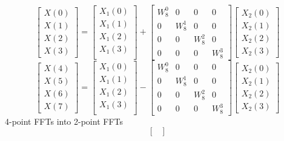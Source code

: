 \documentclass[journal,12pt,twocolumn]{IEEEtran}
\renewcommand\thesection{\arabic{section}}
\begin{document}
\begin{enumerate}[label=\arabic*.,ref=\thesection.\theenumi]
\begin{equation}
\begin{bmatrix}
X(0) \\ 
X(1) \\ 
X(2) \\ 
X(3)
\end{bmatrix}
=
\begin{bmatrix}
X_{1}(0) \\ 
X_{1}(1)\\ 
X_{1}(2)\\
X_{1}(3)\\
\end{bmatrix}
+
\begin{bmatrix}
W^{0}_{8} & 0 & 0 & 0\\
0 & W^{1}_{8} & 0 & 0\\
0 & 0 & W^{2}_{8} & 0\\
0 & 0 & 0 & W^{3}_{8}
\end{bmatrix}
\begin{bmatrix}
X_{2}(0) \\ 
X_{2}(1) \\ 
X_{2}(2) \\
X_{2}(3)
\end{bmatrix}
\end{equation}
\begin{equation}
\begin{bmatrix}
X(4) \\ 
X(5) \\ 
X(6) \\ 
X(7)
\end{bmatrix}
=
\begin{bmatrix}
X_{1}(0) \\ 
X_{1}(1)\\ 
X_{1}(2)\\
X_{1}(3)\\
\end{bmatrix}
-
\begin{bmatrix}
W^{0}_{8} & 0 & 0 & 0\\
0 & W^{1}_{8} & 0 & 0\\
0 & 0 & W^{2}_{8} & 0\\
0 & 0 & 0 & W^{3}_{8}
\end{bmatrix}
\begin{bmatrix}
X_{2}(0) \\ 
X_{2}(1) \\ 
X_{2}(2) \\
X_{2}(3)
\end{bmatrix}
\end{equation}
4-point FFTs into 2-point FFTs
\begin{equation}
\begin{bmatrix}

\end{bmatrix}
\end{equation}
\end{enumerate}
\end{document}
